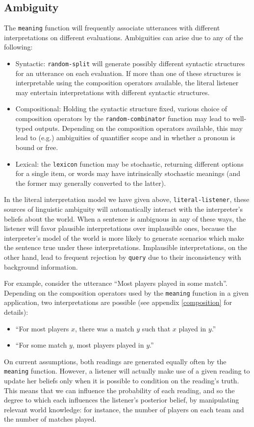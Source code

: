 \documentclass[pdfextras]{handbook}
\begin{document}
\subsection{\label{ambiguity}Ambiguity}
The \lstinline{meaning} function will frequently associate utterances with different interpretations on different evaluations. 
Ambiguities can arise due to any of the following:
\begin{itemize}
\item Syntactic: \lstinline{random-split} will generate possibly different syntactic structures for an utterance on each evaluation. 
If more than one of these structures is interpretable using the composition operators available, the literal listener may entertain interpretations with different syntactic structures.
\item Compositional: Holding the syntactic structure fixed, various choice of composition operators by the \lstinline{random-combinator} function may lead to well-typed outputs. 
Depending on the composition operators available, this may lead to (e.g.) ambiguities of quantifier scope and in whether a pronoun is bound or free.
\item Lexical: the \lstinline{lexicon} function may be stochastic, returning different options for a single item, or words may have intrinsically stochastic meanings (and the former may generally converted to the latter). 
\end{itemize}
In the literal interpretation model we have given above, \lstinline{literal-listener}, these sources of linguistic ambiguity will automatically interact with the interpreter's beliefs about the world.
 When a sentence is ambiguous in any of these ways, the listener will favor plausible interpretations over implausible ones, because the interpreter's model of the world is more likely to generate scenarios which make the sentence true under these interpretations. 
Implausible interpretations, on the other hand, lead to frequent rejection by \lstinline{query} due to their inconsistency with background information.

For example, consider the utterance ``Most players played in some match''. 
Depending on the composition operators used by the \lstinline{meaning} function in a given application, two interpretations are possible (see appendix \ref{composition} for details):
\begin{itemize}
\item ``For most players $x$, there was a match $y$ such that $x$ played in $y$.'' 
\item ``For some match $y$, most players played in $y$.''
\end{itemize}
On current assumptions, both readings are generated equally often by the \lstinline{meaning} function. 
However, a listener will actually make use of a given reading to update her beliefs only when it is possible to condition on the reading's truth. 
This means that we can influence the probability of each reading, and so the degree to which each influences the listener's posterior belief, by manipulating relevant world knowledge: for instance, the number of players on each team and the number of matches played.
\end{document}
